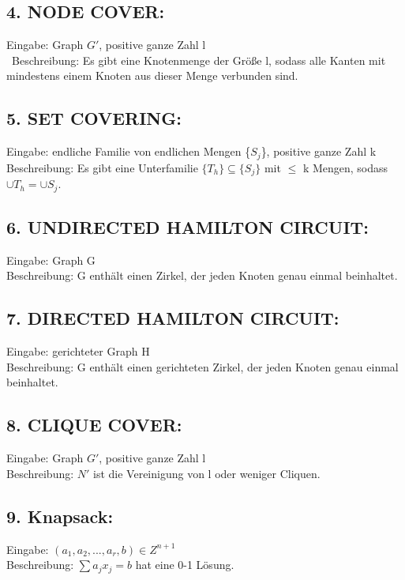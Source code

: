 \documentclass[a4paper,11pt,twoside]{article}
\begin{document}
\subsection*{4. NODE COVER:}
Eingabe: Graph $G'$, positive ganze Zahl l\\\
Beschreibung: Es gibt eine Knotenmenge der Größe l, sodass alle Kanten mit mindestens einem Knoten aus dieser Menge verbunden sind.\\

\subsection*{5. SET COVERING:}
Eingabe: endliche Familie von endlichen Mengen \{$S_j$\}, positive ganze Zahl k\\
Beschreibung: Es gibt eine Unterfamilie  $\{T_h\} \subseteq \{S_j\}$ mit $\leq$ k Mengen, sodass $\cup T_h = \cup S_j$.\\

\subsection*{6. UNDIRECTED HAMILTON CIRCUIT:}
Eingabe: Graph G\\
Beschreibung: G enthält einen Zirkel, der jeden Knoten genau einmal beinhaltet.\\

\subsection*{7. DIRECTED HAMILTON CIRCUIT:}
Eingabe: gerichteter Graph H\\
Beschreibung: G enthält einen gerichteten Zirkel, der jeden Knoten genau einmal beinhaltet. \\

\subsection*{8. CLIQUE COVER:}
Eingabe: Graph $G'$, positive ganze Zahl l\\
Beschreibung: $N'$ ist die Vereinigung von l oder weniger Cliquen.\\

\subsection*{9. Knapsack:}
Eingabe: $(a_1, a_2, ..., a_r, b) \in Z^{n+1}$\\
Beschreibung: $\sum a_j x_j = b$ hat eine 0-1 Lösung.\\
\end{document}
